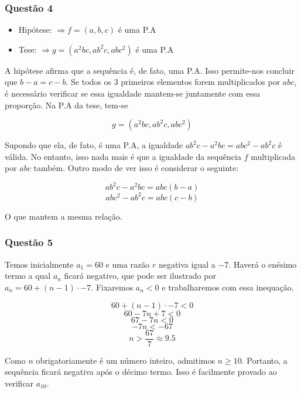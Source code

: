 \subsubsection*{Questão 4}

\hrulefill

\begin{tcolorbox}[colback=LightYellow]
\begin{itemize}
  \item Hipótese: $\Rightarrow f = (a, b, c)$ é uma P.A
        \vspace{0.2cm}
  \item Tese: $\Rightarrow g = (a^{2}bc, ab^{2}c, abc^{2})$ é uma P.A
\end{itemize}
\end{tcolorbox}

A hipótese afirma que a sequência é, de fato, uma P.A. Isso permite-nos concluir que $b - a = c - b$. Se todos os 3 primeiros elementos forem multiplicados por $abc$, é necessário verificar se essa igualdade mantem-se juntamente com essa proporção. Na P.A da tese, tem-se

\[g = (a^{2}bc, ab^{2}c, abc^{2})\]

Supondo que ela, de fato, é uma P.A, a igualdade $ab^{2}c - a^{2}bc = abc^{2} - ab^{2}c$ é válida. No entanto, isso nada mais é que a igualdade da sequência $f$ multiplicada por $abc$ também. Outro modo de ver isso é considerar o seguinte:

\begin{tcolorbox}[colback=LightYellow]
\[ab^{2}c - a^{2}bc = abc(b - a)\]
\[abc^{2} - ab^{2}c = abc(c - b)\]
\end{tcolorbox}

O que mantem a mesma relação.

\subsubsection*{Questão 5}
\hrulefill

Temos inicialmente $a_{1} = 60$ e uma razão $r$ negativa igual a $-7$. Haverá o enésimo termo a qual $a_{n}$ ficará negativo, que pode ser ilustrado por $a_{n} = 60 + (n - 1)\cdot -7$. Fixaremos $a_{n} < 0$ e trabalharemos com essa inequação.

\[60 + (n - 1)\cdot -7 < 0\]
\[60 - 7n + 7 < 0\]
\[67 - 7n < 0\]
\[-7n < -67\]
\[n > \frac{67}{7} \approx 9.5\]

Como $n$ obrigatoriamente é um número inteiro, admitimos $n \geq 10$. Portanto, a sequência ficará negativa após o décimo termo. Isso é facilmente provado ao verificar $a_{10}$.


